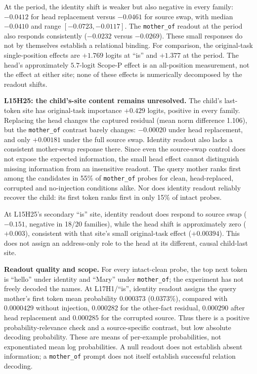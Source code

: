 \documentclass[11pt,a4paper]{article}
\begin{document}
At the period, the identity shift is weaker but also negative in every family:
$-0.0412$ for head replacement versus $-0.0461$ for source swap, with median $-0.0410$
and range $[-0.0723,-0.0117]$. The \texttt{mother\_of} readout at the period also
responds consistently ($-0.0232$ versus $-0.0269$). These small responses do not by
themselves establish a relational binding. For comparison, the original-task
single-position effects are $+1.769$ logits at ``is'' and $+1.377$ at the period.
The head's approximately $5.7$-logit Scope-P effect is an all-position measurement,
not the effect at either site; none of these effects is numerically decomposed by
the readout shifts.

\textbf{L15H25: the child's-site content remains unresolved.} The child's last-token
site has original-task importance $+0.429$ logits, positive in every family. Replacing
the head changes the captured residual (mean norm difference 1.106), but the
\texttt{mother\_of} contrast barely changes: $-0.00020$ under head replacement,
and only $+0.00181$ under the full source swap. Identity readout also lacks a
consistent mother-swap response there. Since even the source-swap control does not
expose the expected information, the small head effect cannot distinguish missing
information from an insensitive readout. The query mother ranks first among the
candidates in 55\% of \texttt{mother\_of} probes for clean, head-replaced, corrupted
and no-injection conditions alike. Nor does identity readout reliably recover the
child: its first token ranks first in only 15\% of intact probes.

At L15H25's secondary ``is'' site, identity readout does respond to source swap
($-0.151$, negative in 18/20 families), while the head shift is approximately zero
($+0.003$), consistent with that site's small original-task effect ($+0.00394$).
This does not assign an address-only role to the head at its different, causal
child-last site.

\textbf{Readout quality and scope.} For every intact-clean probe, the top next token
is ``hello'' under identity and ``Mary'' under \texttt{mother\_of}; the experiment
has not freely decoded the names. At L17H1/``is'', identity readout assigns the query
mother's first token mean probability $0.000373$ (0.0373\%), compared with $0.0000429$
without injection, $0.000282$ for the other-fact residual, $0.000290$ after head
replacement and $0.000285$ for the corrupted source. Thus there is a positive
probability-relevance check and a source-specific contrast, but low absolute decoding
probability. These are means of per-example probabilities, not exponentiated mean
log probabilities. A null readout does not establish absent information; a
\texttt{mother\_of} prompt does not itself establish successful relation decoding.
\end{document}
